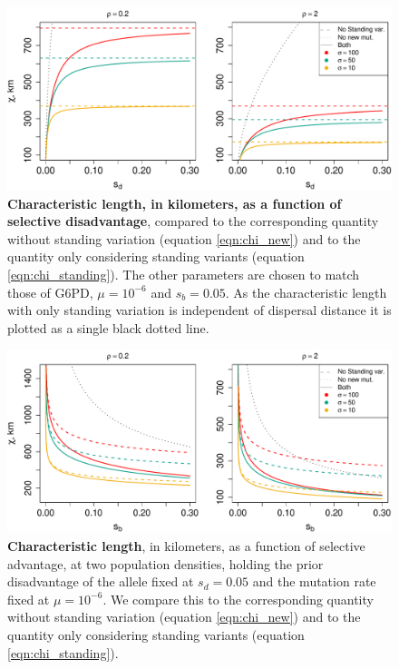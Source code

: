 \documentclass{article}
\newcommand{\gc}[1]{{\it\color{blue}#1}}
\begin{document}
\begin{figure}[ht]
\begin{center}
  \includegraphics[width=1.0\textwidth]{G6PD_charlengths}   %
\caption{ %
{\bf Characteristic length, in kilometers, as a function of selective disadvantage}, 
compared to the corresponding quantity without standing variation (equation \eqref{eqn:chi_new}) 
and to the quantity only considering standing variants (equation \eqref{eqn:chi_standing}).
The other parameters are chosen to match those of G6PD,
\gc{$\mu = 10^{-6}$} and $s_b = 0.05$. As the characteristic length with
only standing variation is independent of dispersal distance it is
plotted as a single black dotted line. 
} \label{Fig-G6PD-charlength}
\end{center}
\end{figure}

\begin{figure}[ht]
\begin{center}
  \includegraphics[width=1.0\textwidth]{G6PD_charlengths_sb}   %
\caption{ %
{\bf Characteristic length}, in kilometers, as a function of selective advantage, at two population densities,
holding the prior disadvantage of the allele fixed at $s_d=0.05$ and the mutation rate fixed at \gc{$\mu=10^{-6}$}.  
We compare this to the corresponding quantity without standing
variation (equation \eqref{eqn:chi_new}) 
and to the quantity only considering standing variants (equation \eqref{eqn:chi_standing}).
} \label{Fig-G6PD-charlength-sb}
\end{center}
\end{figure}
\end{document}
